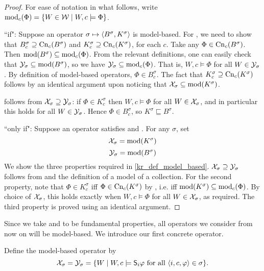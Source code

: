 \begin{proof}
    For ease of notation in what follows, write $\operatorname{mod}_c(\Phi) = \{W \in \mathcal{W}
    \mid W, c \models \Phi\}$.

``if": Suppose an operator $\sigma \mapsto \langle {B^\sigma, K^\sigma} \rangle$ is
model-based. For \closure{}, we need to show that $B^\sigma_c \supseteq
\operatorname{Cn}_c(B^\sigma)$ and $K^\sigma_c \supseteq \operatorname{Cn}_c(K^\sigma)$, for each $c$. Take
any $\Phi \in \operatorname{Cn}_c(B^\sigma)$. Then $\operatorname{mod}(B^\sigma) \subseteq \operatorname{mod}_c(\Phi)$.
From the relevant definitions, one can easily check that $\mathcal{Y}_\sigma \subseteq
\operatorname{mod}(B^\sigma)$, so we have $\mathcal{Y}_\sigma \subseteq \operatorname{mod}_c(\Phi)$. That is, $W,
c \models \Phi$ for all $W \in \mathcal{Y}_\sigma$. By definition of model-based
operators, $\Phi \in B^\sigma_c$. The fact that $K^\sigma_c \supseteq
\operatorname{Cn}_c(K^\sigma)$ follows by an identical argument upon noticing that $\mathcal{X}_\sigma
\subseteq \operatorname{mod}(K^\sigma)$.

\containment{} follows from $\mathcal{X}_\sigma \supseteq \mathcal{Y}_\sigma$: if $\Phi \in
K^\sigma_c$ then $W, c \models \Phi$ for all $W \in \mathcal{X}_\sigma$, and in
particular this holds for all $W \in \mathcal{Y}_\sigma$. Hence $\Phi \in B^\sigma_c$,
so $K^\sigma \sqsubseteq B^\sigma$.

``only if": Suppose an operator satisfies \closure{} and
\containment{}. For any $\sigma$, set
\[
    \mathcal{X}_\sigma = \operatorname{mod}(K^\sigma)
\]
\[
    \mathcal{Y}_\sigma = \operatorname{mod}(B^\sigma)
\]
We show the three properties required in \cref{kr_def_model_based}.  $\mathcal{X}_\sigma
\supseteq \mathcal{Y}_\sigma$ follows from \containment{} and the definition of a
model of a collection. For the second property, note that $\Phi \in K^\sigma_c$
iff $\Phi \in \operatorname{Cn}_c(K^\sigma)$ by \closure{}, i.e. iff $\operatorname{mod}(K^\sigma)
\subseteq \operatorname{mod}_c(\Phi)$.  By choice of $\mathcal{X}_\sigma$, this holds exactly when
$W, c \models \Phi$ for all $W \in \mathcal{X}_\sigma$, as required. The third property
is proved using an identical argument.
\end{proof}

Since we take \closure{} and \containment{} to be fundamental properties, all
operators we consider from now on will be model-based.
%
We introduce our first concrete operator.

\begin{definition}
    \label{kr_def_weakop}
    Define the model-based operator \weakop{} by
    \[
        \mathcal{X}_\sigma = \mathcal{Y}_\sigma = \{
            W \mid W, c \models \mathsf{S}_i\varphi \text{ for all } \langle {i, c, \varphi} \rangle
            \in \sigma
        \}.
    \]
\end{definition}

